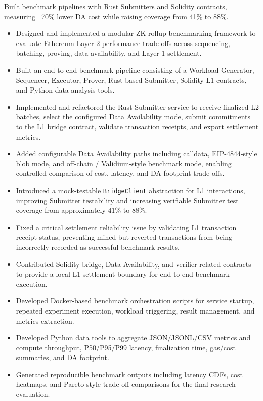 \noindent
{}

\noindent
Built benchmark pipelines with Rust Submitters and Solidity contracts, measuring ~70\% lower DA cost while raising coverage from 41\% to 88\%.

\begin{itemize}
    \item Designed and implemented a modular ZK-rollup benchmarking framework to evaluate Ethereum Layer-2 performance trade-offs across sequencing, batching, proving, data availability, and Layer-1 settlement.
    \item Built an end-to-end benchmark pipeline consisting of a Workload Generator, Sequencer, Executor, Prover, Rust-based Submitter, Solidity L1 contracts, and Python data-analysis tools.
    \item Implemented and refactored the Rust Submitter service to receive finalized L2 batches, select the configured Data Availability mode, submit commitments to the L1 bridge contract, validate transaction receipts, and export settlement metrics.
    \item Added configurable Data Availability paths including calldata, EIP-4844-style blob mode, and off-chain / Validium-style benchmark mode, enabling controlled comparison of cost, latency, and DA-footprint trade-offs.
    \item Introduced a mock-testable \texttt{BridgeClient} abstraction for L1 interactions, improving Submitter testability and increasing verifiable Submitter test coverage from approximately 41\% to 88\%.
    \item Fixed a critical settlement reliability issue by validating L1 transaction receipt status, preventing mined but reverted transactions from being incorrectly recorded as successful benchmark results.
    \item Contributed Solidity bridge, Data Availability, and verifier-related contracts to provide a local L1 settlement boundary for end-to-end benchmark execution.
    \item Developed Docker-based benchmark orchestration scripts for service startup, repeated experiment execution, workload triggering, result management, and metrics extraction.
    \item Developed Python data tools to aggregate JSON/JSONL/CSV metrics and compute throughput, P50/P95/P99 latency, finalization time, gas/cost summaries, and DA footprint.
    \item Generated reproducible benchmark outputs including latency CDFs, cost heatmaps, and Pareto-style trade-off comparisons for the final research evaluation.
\end{itemize}

